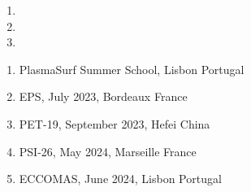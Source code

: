 \newpage
{}
\label{chap:publications}
\begin{enumerate}
\item 
\item 
\item 
\end{enumerate}


\begin{enumerate}
\item PlasmaSurf Summer School, Lisbon Portugal
\item EPS, July 2023, Bordeaux France
\item PET-19, September 2023, Hefei China
\item PSI-26, May 2024, Marseille France
\item ECCOMAS, June 2024, Lisbon Portugal
\end{enumerate}